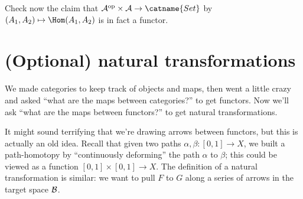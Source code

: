 \begin{exercise}
	Check now the claim that $\AA\op \times \AA \to \catname{Set}$
	by $(A_1, A_2) \mapsto \Hom(A_1, A_2)$ is in fact a functor.
\end{exercise}

\section{(Optional) natural transformations}
We made categories to keep track of objects and maps, then went a little crazy and asked
``what are the maps between categories?'' to get functors.
Now we'll ask ``what are the maps between functors?'' to get natural transformations.

It might sound terrifying that we're drawing arrows between functors, but this is actually an old idea.
Recall that given two paths $\alpha, \beta : [0,1] \to X$,
we built a path-homotopy by ``continuously deforming'' the path $\alpha$ to $\beta$;
this could be viewed as a function $[0,1] \times [0,1] \to X$.
The definition of a natural transformation is similar: we want to pull $F$ to $G$
along a series of arrows in the target space $\mathcal B$.

